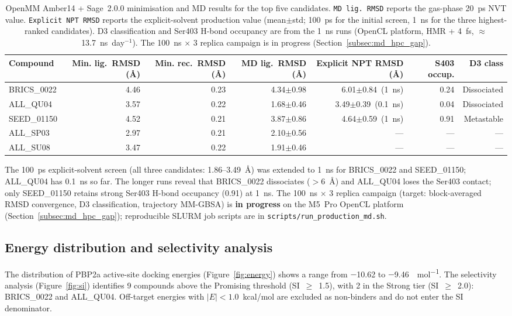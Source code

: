 \documentclass[12pt]{article}
\begin{document}
\begin{table}[H]
  \centering
  \caption{OpenMM Amber14 + Sage~2.0.0 minimisation and MD results for the top five candidates. \texttt{MD lig.\ RMSD} reports the gas-phase 20~ps NVT value. \texttt{Explicit NPT RMSD} reports the explicit-solvent production value (mean$\pm$std; 100~ps for the initial screen, 1~ns for the three highest-ranked candidates). D3 classification and Ser403 H-bond occupancy are from the 1~ns runs (OpenCL platform, HMR + 4~fs, $\approx$13.7~ns~day$^{-1}$). The 100~ns $\times$ 3 replica campaign is in progress (Section~\ref{subsec:md_hpc_gap}).}
  \label{tab:openmm}
  \setlength{\tabcolsep}{3pt}
  \footnotesize
  \begin{tabular}{lrrrrrr}
    \toprule
    Compound & Min. lig.\ RMSD (\si{\angstrom}) & Min. rec.\ RMSD (\si{\angstrom}) & MD lig.\ RMSD (\si{\angstrom}) & Explicit NPT RMSD (\si{\angstrom}) & S403 occup. & D3 class \\
    \midrule
    BRICS\_0022 & 4.46 & 0.23 & 4.34$\pm$0.98 & 6.01$\pm$0.84~(1~ns) & 0.24 & Dissociated \\
    ALL\_QU04 & 3.57 & 0.22 & 1.68$\pm$0.46 & 3.49$\pm$0.39~(0.1~ns) & 0.04 & Dissociated \\
    SEED\_01150 & 4.52 & 0.21 & 3.87$\pm$0.86 & 4.64$\pm$0.59~(1~ns) & 0.91 & Metastable \\
    ALL\_SP03 & 2.97 & 0.21 & 2.10$\pm$0.56 & --- & --- & --- \\
    ALL\_SU08 & 3.47 & 0.22 & 1.91$\pm$0.46 & --- & --- & --- \\
    \bottomrule
  \end{tabular}
  \normalsize
  \setlength{\tabcolsep}{6pt}
  \vspace{2mm}
  \raggedright\parbox{0.95\textwidth}{\footnotesize The 100~ps explicit-solvent screen (all three candidates: 1.86--3.49~\si{\angstrom}) was extended to 1~ns for BRICS\_0022 and SEED\_01150; ALL\_QU04 has 0.1~ns so far. The longer runs reveal that BRICS\_0022 dissociates ($>$6~\si{\angstrom}) and ALL\_QU04 loses the Ser403 contact; only SEED\_01150 retains strong Ser403 H-bond occupancy (0.91) at 1~ns. The 100~ns $\times$ 3 replica campaign (target: block-averaged RMSD convergence, D3 classification, trajectory MM-GBSA) is {\bf in progress} on the M5~Pro OpenCL platform (Section~\ref{subsec:md_hpc_gap}); reproducible SLURM job scripts are in \texttt{scripts/run\_production\_md.sh}.}
\end{table}

\subsection{Energy distribution and selectivity analysis}
The distribution of PBP2a active-site docking energies (Figure~\ref{fig:energy}) shows a range from $-$10.62 to $-$9.46~\si{\kcal\per\mol}. The selectivity analysis (Figure~\ref{fig:si}) identifies 9 compounds above the Promising threshold (SI~$\ge$~1.5), with 2 in the Strong tier (SI~$\ge$~2.0): BRICS\_0022 and ALL\_QU04. Off-target energies with $|E| < 1.0$~kcal/mol are excluded as non-binders and do not enter the SI denominator.
\end{document}
